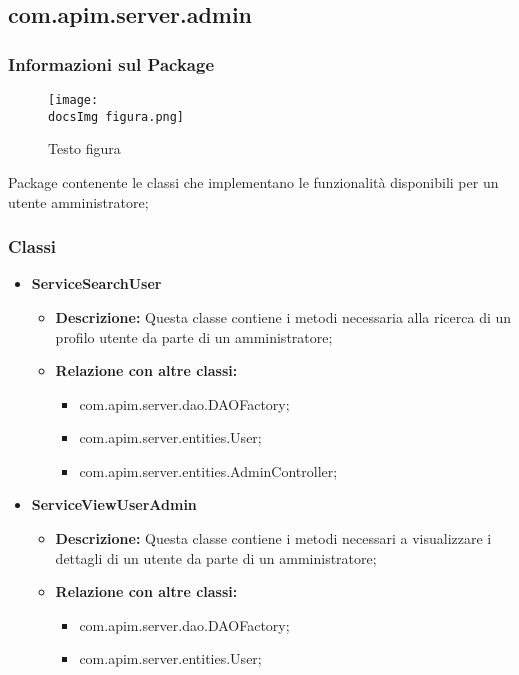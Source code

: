 {{     \subsection{com.apim.server.admin}{
    \subsubsection{Informazioni sul Package}
        \begin{figure}[ht]
          \centering
          \texttt{[image: \\docsImg figura.png]}
          \caption{Testo figura}
          \label{Testo figura}
        \end{figure}
        Package  contenente le classi che implementano le funzionalità disponibili per un utente amministratore;
        \subsubsection{Classi}
        \begin{itemize} \itemsep1pt
          \item \textbf{ServiceSearchUser}
          \begin{itemize}
            \item \textbf{Descrizione:} Questa classe contiene i metodi necessaria alla ricerca di un profilo utente da parte di un amministratore;
            \item \textbf{Relazione con altre classi:}
            \begin{itemize}
              \item com.apim.server.dao.DAOFactory;
              \item com.apim.server.entities.User;
              \item com.apim.server.entities.AdminController;
            \end{itemize}
          \end{itemize}
          \item \textbf{ServiceViewUserAdmin}
          \begin{itemize}
            \item \textbf{Descrizione:} Questa classe contiene i metodi necessari a visualizzare i dettagli di un utente da parte di un amministratore;
            \item \textbf{Relazione con altre classi:}
            \begin{itemize}
              \item com.apim.server.dao.DAOFactory;
              \item com.apim.server.entities.User;

\end{itemize}
\end{itemize}
\end{itemize}}}}
